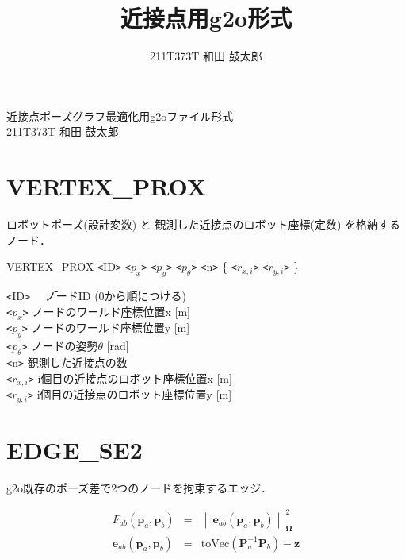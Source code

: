 \documentclass[dvipdfmx]{jsarticle}
\begin{document}

\title{近接点用g2o形式}

\author{211T373T 和田 鼓太郎}



近接点ポーズグラフ最適化用g2oファイル形式\\
211T373T 和田 鼓太郎

\section{VERTEX\_PROX}
ロボットポーズ(設計変数)  と 観測した近接点のロボット座標(定数) を格納するノード．

VERTEX\_PROX \verb|<|ID\verb|>| \verb|<|$p_x$\verb|>| \verb|<|$p_y$\verb|>| \verb|<|$p_\theta$\verb|>| \verb|<|n\verb|>| \{ \verb|<|$r_{x,i}$\verb|>| \verb|<|$r_{y,i}$\verb|>| \}

\begin{tabbing}
	\verb|<|ID\verb|>|　 	\= ノードID (0から順につける) \\
	\verb|<|$p_x$\verb|>| 	\> ノードのワールド座標位置x [m] \\
	\verb|<|$p_y$\verb|>| 	\> ノードのワールド座標位置y [m] \\
	\verb|<|$p_\theta$\verb|>| \> ノードの姿勢$\theta$ [rad] \\
	\verb|<|n\verb|>| 		\> 観測した近接点の数 \\
	\verb|<|$r_{x,i}$\verb|>|	\> i個目の近接点のロボット座標位置x [m] \\
	\verb|<|$r_{y,i}$\verb|>|	\> i個目の近接点のロボット座標位置y [m]
\end{tabbing}

\section{EDGE\_SE2}
g2o既存のポーズ差で2つのノードを拘束するエッジ．

\begin{eqnarray}
	F_{ab} \left( \bm{p}_a, \bm{p}_b \right) &=& \left\| \bm{e}_{ab} \left( \bm{p}_a, \bm{p}_b \right) \right\|_{\bm{\Omega}}^2 \\
	\bm{e}_{ab} \left( \bm{p}_a, \bm{p}_b \right) &=& \mathrm{toVec}\left( \bm{P}_a^{-1} \bm{P}_b \right) - \bm{z}
\end{eqnarray}
\end{document}
